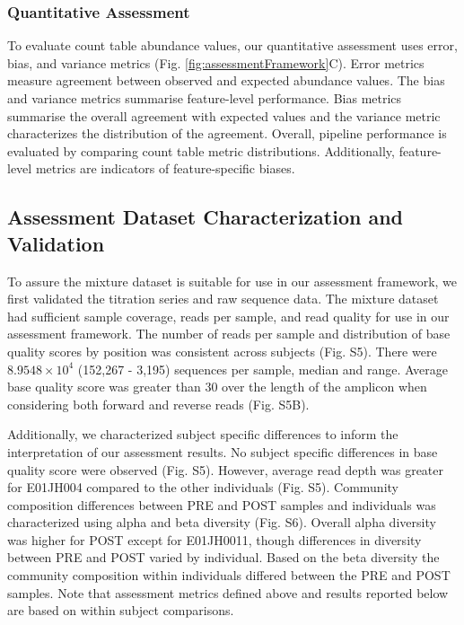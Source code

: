 \documentclass[linenumbers]{bmcart}
\begin{document}
\subsubsection*{Quantitative Assessment}
To evaluate count table abundance values, our quantitative assessment uses error, bias, and variance metrics (Fig. \ref{fig:assessmentFramework}C).
Error metrics measure agreement between observed and expected abundance values.
The bias and variance metrics summarise feature-level performance. 
Bias metrics summarise the overall agreement with expected values and the variance metric characterizes the distribution of the agreement.
Overall, pipeline performance is evaluated by comparing count table metric distributions.
Additionally, feature-level metrics are indicators of feature-specific biases.

\subsection*{Assessment Dataset Characterization and Validation}
To assure the mixture dataset is suitable for use in our assessment framework, we first validated the titration series and raw sequence data.
The mixture dataset had sufficient sample coverage, reads per sample, and read quality for use in our assessment framework. 
The number of reads per sample and distribution of base quality scores by position was consistent across subjects (Fig. S5).
There were \(8.9548\times 10^{4}\) (152,267 - 3,195) sequences per sample, median and
range. Average base quality score was greater than 30 over the length of the amplicon when considering both forward and reverse reads (Fig. S5B).

Additionally, we characterized subject specific differences to inform the interpretation of our assessment results.
No subject specific differences in base quality score were observed (Fig. S5). However, average read depth was greater for E01JH004 compared to the other individuals (Fig. S5).
Community composition differences between PRE and POST samples and individuals was characterized using alpha and beta diversity (Fig. S6). 
Overall alpha diversity was higher for POST except for E01JH0011, 
though differences in diversity between PRE and POST varied by individual. 
Based on the beta diversity the community composition within individuals differed between the PRE and POST samples. Note that assessment metrics defined above and results reported below are based on within subject comparisons.
\end{document}
